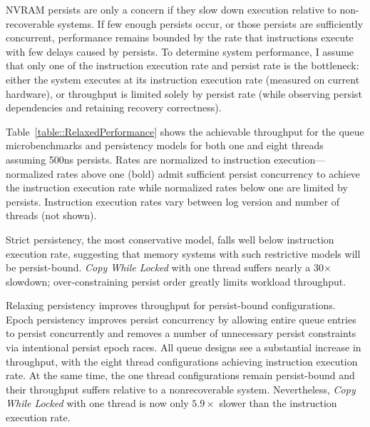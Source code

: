 NVRAM persists are only a concern if they slow down execution relative to non-recoverable systems.
If few enough persists occur, or those persists are sufficiently concurrent, performance remains bounded by the rate that instructions execute with few delays caused by persists.
To determine system performance, I assume that only one of the instruction execution rate and persist rate is the bottleneck: either the system executes at its instruction execution rate (measured on current hardware), or throughput is limited solely by persist rate (while observing persist dependencies and retaining recovery correctness).



Table~\ref{table::RelaxedPerformance} shows the achievable throughput for the queue microbenchmarks and persistency models for both one and eight threads assuming 500ns persists.
Rates are normalized to instruction execution---normalized rates above one (bold) admit sufficient persist concurrency to achieve the instruction execution rate while normalized rates below one are limited by persists.
Instruction execution rates vary between log version and number of threads (not shown).

Strict persistency, the most conservative model, falls well below instruction execution rate, suggesting that memory systems with such restrictive models will be persist-bound.
\emph{Copy While Locked} with one thread suffers nearly a 30$\times$ slowdown; over-constraining persist order greatly limits workload throughput.

Relaxing persistency improves throughput for persist-bound configurations.
Epoch persistency improves persist concurrency by allowing entire queue entries to persist concurrently and removes a number of unnecessary persist constraints via intentional persist epoch races.
All queue designs see a substantial increase in throughput, with the eight thread configurations achieving instruction execution rate.
At the same time, the one thread configurations remain persist-bound and their throughput suffers relative to a nonrecoverable system.
Nevertheless, \emph{Copy While Locked} with one thread is now only $5.9\times$ slower than the instruction execution rate.

